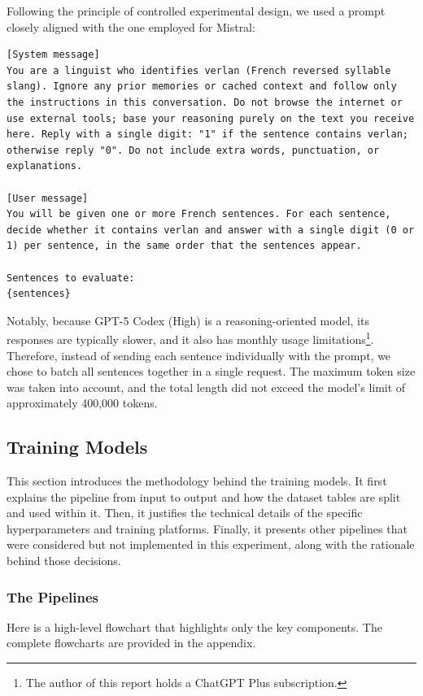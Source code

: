 \documentclass[12pt]{article}
\begin{document}
Following the principle of controlled experimental design, we used a prompt closely aligned with the one employed for Mistral:

\begin{lstlisting}
[System message]
You are a linguist who identifies verlan (French reversed syllable slang). Ignore any prior memories or cached context and follow only the instructions in this conversation. Do not browse the internet or use external tools; base your reasoning purely on the text you receive here. Reply with a single digit: "1" if the sentence contains verlan; otherwise reply "0". Do not include extra words, punctuation, or explanations.

[User message]
You will be given one or more French sentences. For each sentence, decide whether it contains verlan and answer with a single digit (0 or 1) per sentence, in the same order that the sentences appear.

Sentences to evaluate:
{sentences}
\end{lstlisting}

Notably, because GPT-5 Codex (High) is a reasoning-oriented model, its responses are typically slower, and it also has monthly usage limitations\footnote{The author of this report holds a ChatGPT Plus subscription.}. Therefore, instead of sending each sentence individually with the prompt, we chose to batch all sentences together in a single request. The maximum token size was taken into account, and the total length did not exceed the model's limit of approximately 400,000 tokens.

\subsection{Training Models}
This section introduces the methodology behind the training models. It first explains the pipeline from input to output and how the dataset tables are split and used within it. Then, it justifies the technical details of the specific hyperparameters and training platforms. Finally, it presents other pipelines that were considered but not implemented in this experiment, along with the rationale behind those decisions.

\subsubsection{The Pipelines}
Here is a high-level flowchart that highlights only the key components. The complete flowcharts are provided in the appendix.
\end{document}
